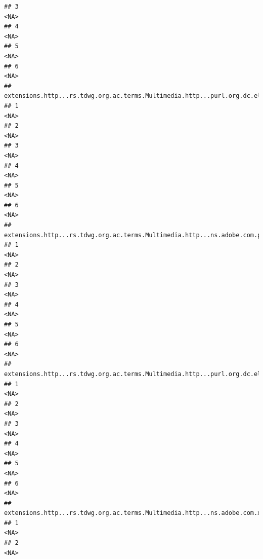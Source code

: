 \documentclass[
]{book}
\begin{document}
\begin{verbatim}
## 3                                                                                       <NA>
## 4                                                                                       <NA>
## 5                                                                                       <NA>
## 6                                                                                       <NA>
##   extensions.http...rs.tdwg.org.ac.terms.Multimedia.http...purl.org.dc.elements.1.1.format
## 1                                                                                     <NA>
## 2                                                                                     <NA>
## 3                                                                                     <NA>
## 4                                                                                     <NA>
## 5                                                                                     <NA>
## 6                                                                                     <NA>
##   extensions.http...rs.tdwg.org.ac.terms.Multimedia.http...ns.adobe.com.photoshop.1.0.Credit
## 1                                                                                       <NA>
## 2                                                                                       <NA>
## 3                                                                                       <NA>
## 4                                                                                       <NA>
## 5                                                                                       <NA>
## 6                                                                                       <NA>
##   extensions.http...rs.tdwg.org.ac.terms.Multimedia.http...purl.org.dc.elements.1.1.creator
## 1                                                                                      <NA>
## 2                                                                                      <NA>
## 3                                                                                      <NA>
## 4                                                                                      <NA>
## 5                                                                                      <NA>
## 6                                                                                      <NA>
##   extensions.http...rs.tdwg.org.ac.terms.Multimedia.http...ns.adobe.com.xap.1.0.CreateDate
## 1                                                                                     <NA>
## 2                                                                                     <NA>

\end{verbatim}
\end{document}
